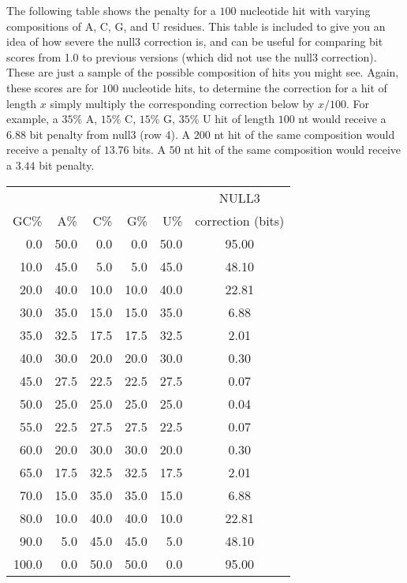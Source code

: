 The following table shows the penalty for a $100$ nucleotide hit with
varying compositions of A, C, G, and U residues. This table is included to give you
an idea of how severe the null3 correction is, and can be useful for
comparing bit scores from  1.0 to previous
versions (which did not use the null3 correction). These are just a
sample of the possible composition of hits you might see. Again, these
scores are for $100$ nucleotide hits, to determine the correction for
a hit of length $x$ simply multiply the corresponding correction below
by $x/100$. For example, a $35$\% A, $15$\% C, $15$\% G, $35$\% U hit
of length $100$ nt would receive a $6.88$ bit penalty from
null3 (row 4). A $200$ nt hit of the same composition would
receive a penalty of $13.76$ bits. A $50$ nt hit of the same
composition would receive a $3.44$ bit penalty.

\vspace{0.5in}

\begin{center}
\begin{tabular}{r|rrrr|c}
      &        &        &        &        & NULL3 \\ 
  GC\%&    A\% &   C\%  &   G\%  &    U\% & correction (bits)  \\ \hline
  0.0 &   50.0 &    0.0 &    0.0 &   50.0 &              95.00 \\
 10.0 &   45.0 &    5.0 &    5.0 &   45.0 &              48.10 \\
 20.0 &   40.0 &   10.0 &   10.0 &   40.0 &              22.81 \\
 30.0 &   35.0 &   15.0 &   15.0 &   35.0 &               6.88 \\
 35.0 &   32.5 &   17.5 &   17.5 &   32.5 &               2.01 \\
 40.0 &   30.0 &   20.0 &   20.0 &   30.0 &               0.30 \\
 45.0 &   27.5 &   22.5 &   22.5 &   27.5 &               0.07 \\
 50.0 &   25.0 &   25.0 &   25.0 &   25.0 &               0.04 \\
 55.0 &   22.5 &   27.5 &   27.5 &   22.5 &               0.07 \\
 60.0 &   20.0 &   30.0 &   30.0 &   20.0 &               0.30 \\
 65.0 &   17.5 &   32.5 &   32.5 &   17.5 &               2.01 \\
 70.0 &   15.0 &   35.0 &   35.0 &   15.0 &               6.88 \\
 80.0 &   10.0 &   40.0 &   40.0 &   10.0 &              22.81 \\
 90.0 &    5.0 &   45.0 &   45.0 &    5.0 &              48.10 \\
100.0 &    0.0 &   50.0 &   50.0 &    0.0 &              95.00 \\

\end{tabular}
\end{center}

